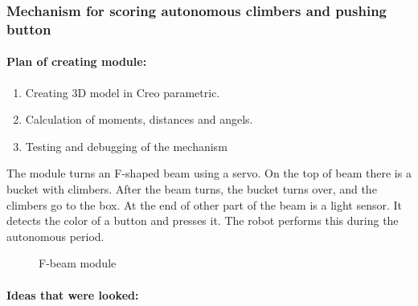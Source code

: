 \subsubsection{Mechanism for scoring autonomous climbers and pushing button}
\paragraph{Plan of creating module:}	
	
	\begin{enumerate}
		\item Creating 3D model in Creo parametric.
		\item Calculation of moments, distances and angels.
		\item Testing and debugging of the mechanism
	\end{enumerate}
	
	The module turns an F-shaped beam using a servo. On the top of beam there is a bucket with climbers. After the beam turns, the bucket turns over, and the climbers go to the box. At the end of other part of the beam is a light sensor. It detects the color of a button and presses it. The robot performs this during the autonomous period.
  \begin{figure}[H]
		\begin{minipage}[h]{\linewidth}
			\caption{F-beam module}
		\end{minipage}
	\end{figure}
	
	\paragraph{Ideas that were looked:}
	
